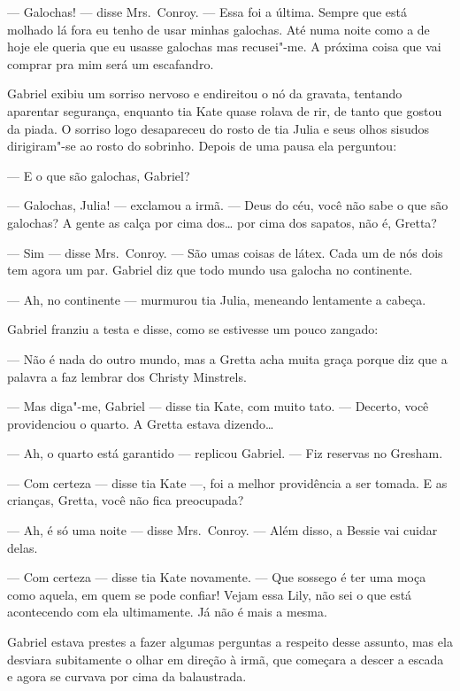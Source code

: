 --- Galochas! --- disse Mrs.~Conroy.  --- Essa foi a última.  Sempre que está
molhado lá fora eu tenho de usar minhas galochas.  Até numa noite como a de
hoje ele queria que eu usasse galochas mas recusei"-me.  A próxima coisa que vai
comprar pra mim será um escafandro.

Gabriel exibiu um sorriso nervoso e endireitou o nó da gravata, tentando
aparentar segurança, enquanto tia Kate quase rolava de rir, de tanto que gostou
da piada.  O sorriso logo desapareceu do rosto de tia Julia e seus olhos
sisudos dirigiram"-se ao rosto do sobrinho.  Depois de uma pausa ela perguntou:

--- E o que são galochas, Gabriel?

--- Galochas, Julia! --- exclamou a irmã.  --- Deus do céu, você não sabe o que
são galochas?  A gente as calça por cima dos\ldots{} por cima dos sapatos, não
é, Gretta?

--- Sim --- disse Mrs.~Conroy.  --- São umas coisas de látex.  Cada um de nós
dois tem agora um par.  Gabriel diz que todo mundo usa galocha no continente.

--- Ah, no continente --- murmurou tia Julia, meneando lentamente a cabeça.

Gabriel franziu a testa e disse, como se estivesse um pouco zangado:

--- Não é nada do outro mundo, mas a Gretta acha muita graça porque diz que a
palavra a faz lembrar dos Christy Minstrels.

--- Mas diga"-me, Gabriel --- disse tia Kate, com muito tato.  --- Decerto, você
providenciou o quarto.  A Gretta estava dizendo\ldots{}

--- Ah, o quarto está garantido --- replicou Gabriel.  --- Fiz reservas no
Gresham.

--- Com certeza --- disse tia Kate ---, foi a melhor providência a ser tomada.
E as crianças, Gretta, você não fica preocupada?

--- Ah, é só uma noite --- disse Mrs.~Conroy.  --- Além disso, a Bessie vai
cuidar delas.

--- Com certeza --- disse tia Kate novamente.  --- Que sossego é ter uma moça
como aquela, em quem se pode confiar!  Vejam essa Lily, não sei o que está
acontecendo com ela ultimamente.  Já não é mais a mesma.

Gabriel estava prestes a fazer algumas perguntas a respeito desse assunto, mas
ela desviara subitamente o olhar em direção à irmã, que começara a descer a
escada e agora se curvava por cima da balaustrada.

